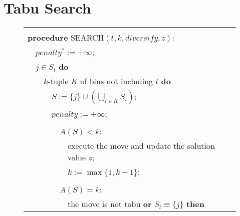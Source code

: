 \newpage
{}
\section*{\thesection \quad Tabu Search}

\begin{figure}[h!]
\begin{center}
\begin{scriptsize}
\begin{tabular}{|lllllll|}\hline%
   &    &    &    &    &    &\\%
\multicolumn{7}{|l|}{{\bf procedure} SEARCH$(t,k,diversify,z)$:} \\%
   & \multicolumn{6}{l|}{\hspace{0.3cm}$penalty^{*}:=+\infty$;} \\%
   & \multicolumn{6}{l|}{\hspace{0.3cm}{\bf for each} $j\in S_{t}$ {\bf do}} \\%
   &    & \multicolumn{5}{l|}{\hspace{0.6cm}{\bf for each} $k$-tuple $K$ of bins not including $t$ {\bf do}} \\%
   &    &    & \multicolumn{4}{l|}{\hspace{0.9cm}$S:=\{j\}\cup(\bigcup_{i\in K}S_{i})$;} \\%
   &    &    & \multicolumn{4}{l|}{\hspace{0.9cm}$penalty := +\infty$;} \\%
   &    &    & \multicolumn{4}{l|}{\hspace{0.9cm}{\bf case}} \\%
   &    &    &    & \multicolumn{3}{l|}{\hspace{1.2cm}$A(S) < k$:} \\%
   &    &    &    &    & \multicolumn{2}{l|}{\hspace{1.5cm}execute the move and update the solution value $z$;} \\%
   &    &    &    &    & \multicolumn{2}{l|}{\hspace{1.5cm}$k := \max\{1,k-1\}$;} \\%
   &    &    &    &    & \multicolumn{2}{l|}{\hspace{1.5cm}{\bf return;}} \\%
   &    &    &    & \multicolumn{3}{l|}{\hspace{1.2cm}$A(S) = k$:} \\%
   &    &    &    &    & \multicolumn{2}{l|}{\hspace{1.5cm}{\bf if} the move is not tabu {\bf or} $S_{t}\equiv\{j\}$ {\bf then}} \\%

\end{tabular}
\end{scriptsize}
\end{center}
\end{figure}
